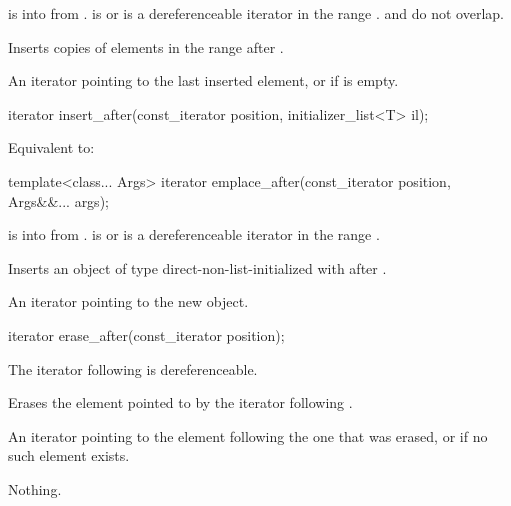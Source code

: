 \begin{itemdescr}
\pnum
\expects
{} is  into 
from .
 is  or
is a dereferenceable iterator in the range .
 and  do not overlap.

\pnum
\effects
Inserts copies of elements in the range  after .

\pnum
\returns
An iterator pointing to the last inserted element,
or  if  is empty.
\end{itemdescr}

%
\begin{itemdecl}
iterator insert_after(const_iterator position, initializer_list<T> il);
\end{itemdecl}

\begin{itemdescr}
\pnum
\effects
Equivalent to: 
\end{itemdescr}


%
\begin{itemdecl}
template<class... Args>
  iterator emplace_after(const_iterator position, Args&&... args);
\end{itemdecl}

\begin{itemdescr}
\pnum
\expects
{} is  into 
from .
 is  or is a dereferenceable
iterator in the range .

\pnum
\effects
Inserts an object of type  direct-non-list-initialized with
 after .

\pnum
\returns
An iterator pointing to the new object.
\end{itemdescr}

%
\begin{itemdecl}
iterator erase_after(const_iterator position);
\end{itemdecl}

\begin{itemdescr}
\pnum
\expects
The iterator following  is dereferenceable.

\pnum
\effects
Erases the element pointed to by the iterator following .

\pnum
\returns
An iterator pointing to the element following the one that was
erased, or  if no such element exists.

\pnum
\throws
Nothing.
\end{itemdescr}

